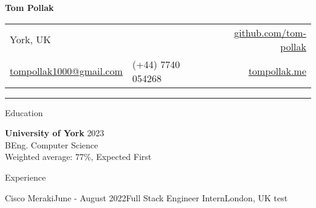 \documentclass{structure} %
\begin{document}
{\namesize\bf{Tom Pollak}}
\par\smallskip


\noindent\begin{tabularx}{\textwidth}{@{}XXr}
York, UK & & \href{https://github.com/tom-pollak}{github.com/tom-pollak}\\
\href{mailto:tompollak1000@gmail.com}{tompollak1000@gmail.com} & (+44) 7740 054268 & \href{https://tompollak.me}{tompollak.me}
\end{tabularx}
\par\smallskip
\hrule %
\bigskip

\begin{rSection}{Education}

{\bf University of York} \hfill{2023} \\
BEng. Computer Science \smallskip \\
Weighted average: 77\%, Expected First

\end{rSection}


\begin{rSection}{Experience}

\begin{rSubsection}{Cisco Meraki}{June - August 2022}{Full Stack Engineer Intern}{London, UK}{}
   test 
\end{rSubsection}

\end{rSection}


\end{document}
